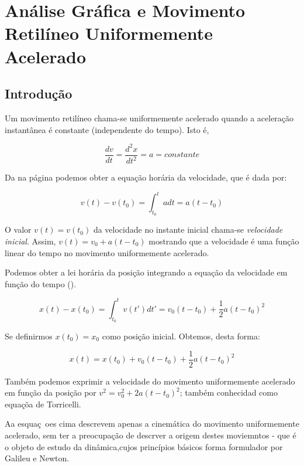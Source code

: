 \chapter[Análise Gráfica e MRUA]{Análise Gráfica e Movimento Retilíneo Uniformemente Acelerado}

\section{Introdução}
Um movimento retilíneo chama-se uniformemente acelerado quando a a\-ce\-le\-ra\-ção instantânea é constante (independente do tempo). Isto é,

\begin{equation}
\label{eq:aceleracao}
\dfrac{dv}{dt} = \dfrac{d^{2}x}{dt^2} =  a = constante
\end{equation}

Da  na página \pageref{eq:aceleracao} podemos obter a equação horária da velocidade, que é dada por:

\begin{equation}
\label{eq:velocidade}
v(t) - v(t_0) = \int_{t_0}^{t}\!\!\!adt = a(t-t_0)
\end{equation}

O valor $v(t) = v(t_0)$ da velocidade no ins\-tan\-te inicial chama-se \emph{velocidade inicial}. Assim, $v(t) = v_0 + a(t-t_0)$ mostrando que a velocidade é uma função linear do tempo no movimento uniformemente acelerado.

Podemos obter a lei horária da posição integrando a equação da velocidade em função do tempo ().

\begin{equation}
x(t) - x(t_0) = \int_{t_0}^{t}v(t')\!\!\!dt' = v_0(t - t_0) + \frac{1}{2}a(t - t_0)^2
\end{equation}

Se definirmos $x(t_0) = x_0$ como posição inicial. Obtemos, desta forma:

\begin{equation}
x(t) = x(t_0) + v_0(t-t_0) + \frac{1}{2}a(t - t_0)^2
\end{equation}

Também podemos exprimir a velocidade do movimento uniformemente acelerado em função da posição por $v^2 = v_{0}^2 + 2a(t-t_0)^2$; também conhecidad como equaçõa de Torricelli.

Aa esquaç~oes cima descrevem apenas a cinemática do movimento uniformemente acelerado, sem ter a preocupação de descrver a origem destes moviemntos - que é o objeto de estudo da dinâmica,cujos princípios básicos  forma formulador por Galileu e Newton.
